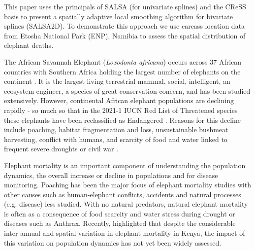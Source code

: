 \documentclass[letterpaper, 12pt]{interact}
\begin{document}
	This paper uses the principals of SALSA (for univariate splines) and the CReSS basis to present a spatially adaptive local smoothing algorithm for bivariate splines (SALSA2D). To demonstrate this approach we use carcass location data from Etosha National Park (ENP), Namibia to assess the spatial distribution of elephant deaths.  
	
	
	The African Savannah Elephant (\textit{Loxodonta africana}) occurs across 37 African countries with Southern Africa holding the largest number of elephants on the continent \cite{thouless2016}. It is the largest living terrestrial mammal, social, intelligent, an ecosystem engineer, a species of great conservation concern, and has been studied extensively. However, continental African elephant populations are declining rapidly - so much so that in the 2021-1 IUCN Red List of Threatened species these elephants have been reclassified as Endangered \cite{iucnlist}. Reasons for this decline include poaching, habitat fragmentation and loss, unsustainable bushmeat harvesting, conflict with humans, and scarcity of food and water linked to frequent severe droughts or civil war \cite{chase2016, ripple2015}.
	
	Elephant mortality is an important component of understanding the population dynamics, the overall increase or decline in populations and for disease monitoring.  Poaching has been the major focus of elephant mortality studies \cite{douglas1987, wittemyer2014, beale2018} with other causes such as human-elephant conflicts, accidents and natural processes (e.g. disease) less studied. With no natural predators, natural elephant mortality is often as a consequence of food scarcity and water stress during drought \citep{mukeka2022} or diseases such as Anthrax.  Recently, \citet{mukeka2022} highlighted that despite the considerable inter-annual and spatial variation in elephant mortality in Kenya, the impact of this variation on population dynamics has not yet been widely assessed.  
	
	
	
\end{document}
